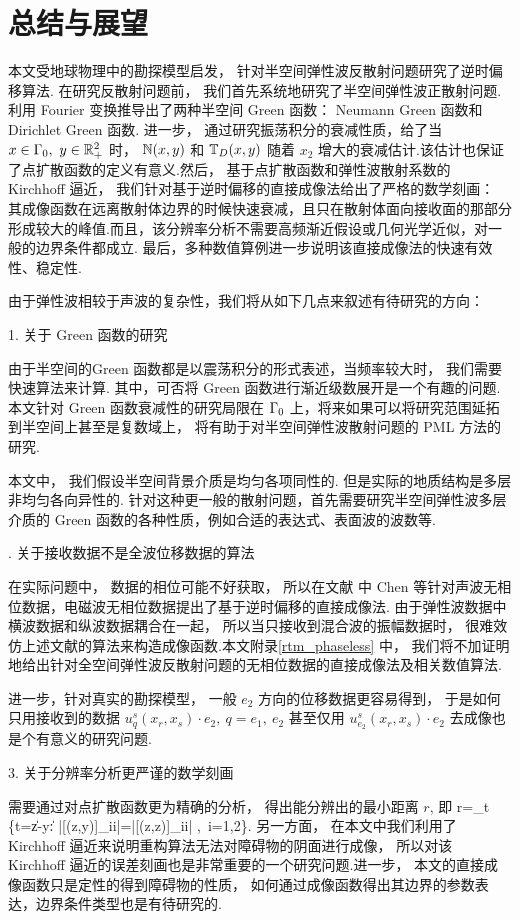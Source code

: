 \chapter{总结与展望} \label{chap:summary}

本文受地球物理中的勘探模型启发， 针对半空间弹性波反散射问题研究了逆时偏移算法. 在研究反散射问题前， 我们首先系统地研究了半空间弹性波正散射问题.利用 Fourier 变换推导出了两种半空间 Green 函数： Neumann Green 函数和 Dirichlet Green 函数. 进一步， 通过研究振荡积分的衰减性质，给了当 $x\in \Gamma_0, \ y\in \mathbb{R}^2_+$ 时， $\mathbb{N}(x,y)$ 和 $\mathbb{T}_D(x,y)$ 随着 $x_2$ 增大的衰减估计.该估计也保证了点扩散函数的定义有意义.然后， 基于点扩散函数和弹性波散射系数的 Kirchhoff 逼近， 我们针对基于逆时偏移的直接成像法给出了严格的数学刻画： 其成像函数在远离散射体边界的时候快速衰减，且只在散射体面向接收面的那部分形成较大的峰值.而且，该分辨率分析不需要高频渐近假设或几何光学近似，对一般的边界条件都成立. 最后，多种数值算例进一步说明该直接成像法的快速有效性、稳定性.

由于弹性波相较于声波的复杂性，我们将从如下几点来叙述有待研究的方向：

1. 关于 Green 函数的研究

由于半空间的Green 函数都是以震荡积分的形式表述，当频率较大时， 我们需要快速算法来计算. 其中，可否将 Green 函数进行渐近级数展开是一个有趣的问题.本文针对 Green 函数衰减性的研究局限在 $\Gamma_0$ 上，将来如果可以将研究范围延拓到半空间上甚至是复数域上， 将有助于对半空间弹性波散射问题的 PML 方法的研究.

 本文中， 我们假设半空间背景介质是均匀各项同性的. 但是实际的地质结构是多层非均匀各向异性的. 针对这种更一般的散射问题，首先需要研究半空间弹性波多层介质的 Green 函数的各种性质，例如合适的表达式、表面波的波数等. 

. 关于接收数据不是全波位移数据的算法

在实际问题中， 数据的相位可能不好获取， 所以在文献 \cite{chen2016direct,chen2017direct,chen2017phaseless} 中 Chen 等针对声波无相位数据，电磁波无相位数据提出了基于逆时偏移的直接成像法. 由于弹性波数据中横波数据和纵波数据耦合在一起， 所以当只接收到混合波的振幅数据时， 很难效仿上述文献的算法来构造成像函数.本文附录\ref{rtm_phaseless} 中， 我们将不加证明地给出针对全空间弹性波反散射问题的无相位数据的直接成像法及相关数值算法.

进一步，针对真实的勘探模型， 一般 $e_2$ 方向的位移数据更容易得到， 于是如何只用接收到的数据 $u^s_q(x_r,x_s)\cdot e_2, \ q=e_1, \ e_2$ 甚至仅用 $u^s_{e_2}(x_r,x_s)\cdot e_2$ 去成像也是个有意义的研究问题.

\bigskip

3. 关于分辨率分析更严谨的数学刻画

需要通过对点扩散函数更为精确的分析， 得出能分辨出的最小距离 $r$, 即
\ben
r=\inf_{t} \{t=\|z-y\| : |[\J(z,y)]_{ii}|=|[\J(z,z)]_{ii}| ,\ i=1,2\}.
\een
另一方面， 在本文中我们利用了 Kirchhoff 逼近来说明重构算法无法对障碍物的阴面进行成像， 所以对该 Kirchhoff 逼近的误差刻画也是非常重要的一个研究问题.进一步， 本文的直接成像函数只是定性的得到障碍物的性质， 如何通过成像函数得出其边界的参数表达，边界条件类型也是有待研究的.
